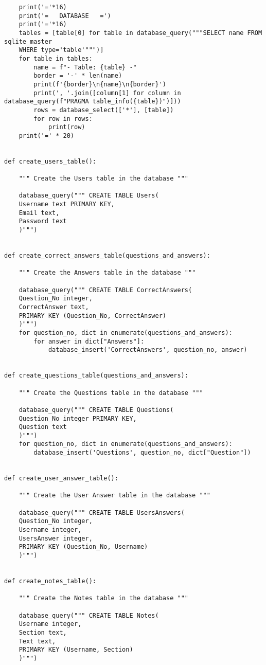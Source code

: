 \documentclass{article}
\begin{document}
\begin{lstlisting}
    print('='*16)
    print('=   DATABASE   =')
    print('='*16)
    tables = [table[0] for table in database_query("""SELECT name FROM sqlite_master
    WHERE type='table'""")]
    for table in tables:
        name = f"- Table: {table} -"
        border = '-' * len(name)
        print(f'{border}\n{name}\n{border}')
        print(', '.join([column[1] for column in database_query(f"PRAGMA table_info({table})")]))
        rows = database_select(['*'], [table])
        for row in rows:
            print(row)
    print('=' * 20)


def create_users_table():

    """ Create the Users table in the database """

    database_query(""" CREATE TABLE Users(
    Username text PRIMARY KEY,
    Email text,
    Password text
    )""")


def create_correct_answers_table(questions_and_answers):

    """ Create the Answers table in the database """

    database_query(""" CREATE TABLE CorrectAnswers(
    Question_No integer,
    CorrectAnswer text,
    PRIMARY KEY (Question_No, CorrectAnswer)
    )""")
    for question_no, dict in enumerate(questions_and_answers):
        for answer in dict["Answers"]:
            database_insert('CorrectAnswers', question_no, answer)


def create_questions_table(questions_and_answers):

    """ Create the Questions table in the database """

    database_query(""" CREATE TABLE Questions(
    Question_No integer PRIMARY KEY,
    Question text
    )""")
    for question_no, dict in enumerate(questions_and_answers):
        database_insert('Questions', question_no, dict["Question"])


def create_user_answer_table():

    """ Create the User Answer table in the database """

    database_query(""" CREATE TABLE UsersAnswers(
    Question_No integer,
    Username integer,
    UsersAnswer integer,
    PRIMARY KEY (Question_No, Username)
    )""")


def create_notes_table():

    """ Create the Notes table in the database """

    database_query(""" CREATE TABLE Notes(
    Username integer,
    Section text,
    Text text,
    PRIMARY KEY (Username, Section)
    )""")



\end{lstlisting}
\end{document}
